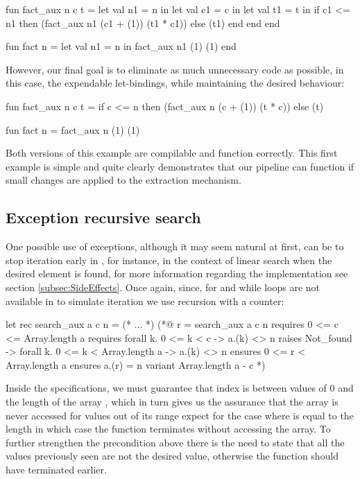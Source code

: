 \begin{cakeml}
fun fact_aux n c t = let val n1 = n in
  let val c1 = c in
  let val t1 = t in
  if c1 <= n1 then (fact_aux n1 (c1 + (1)) (t1 * c1))  else (t1)
  end end end

fun fact n = let val n1 = n in fact_aux n1 (1) (1) end
\end{cakeml}

However, our final goal is to eliminate as much unnecessary code as possible, in this case, the expendable let-bindings, while 
maintaining the desired behaviour:

\begin{cakeml}
fun fact_aux n c t = 
  if c <= n then (fact_aux n (c + (1)) (t * c))  else (t)

fun fact n = fact_aux n (1) (1)
\end{cakeml}

Both versions of this example are compilable and function correctly. This first example is simple and quite clearly demonstrates that
our pipeline can function if small changes are applied to the extraction mechanism.

\subsection{Exception recursive search}

One possible use of exceptions, although it may seem natural at first, can be to stop iteration early in \ocaml, for instance, in the 
context of linear search when the desired element is found, for more information regarding the implementation see section 
\ref{subsec:SideEffects}. Once again, since, for and while loops are not available in \cml to simulate iteration we use recursion 
with a counter:

\begin{gospell}
let rec search_aux a c n = (* ... *)
(*@
  r = search_aux a c n
  requires 0 <= c <= Array.length a
  requires forall k. 0 <= k < c -> a.(k) <> n
  raises Not_found -> forall k. 0 <= k < Array.length a -> a.(k) <> n
  ensures 0 <= r < Array.length a
  ensures a.(r) = n
  variant Array.length a - c
*)
\end{gospell}

Inside the \gospel specifications, we must guarantee that index  is between values of 0 and the length of the array 
, which in turn gives us the assurance that the array is never accessed for values out of its range expect for the case 
where  is equal to the length in which case the function terminates without accessing the array. To further strengthen the
precondition above there is the need to state that all the values previously seen are not the desired value, otherwise the function
should have terminated earlier.

